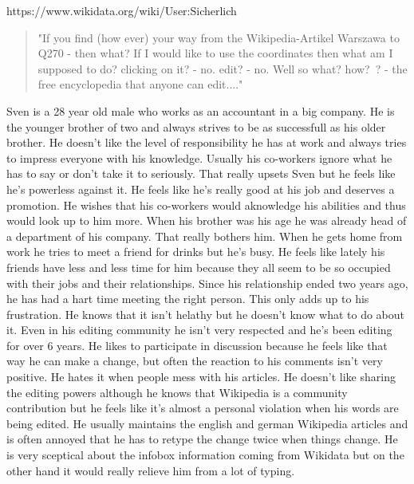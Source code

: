\documentclass{article}
\begin{document}
\pagebreak

https://www.wikidata.org/wiki/User:Sicherlich
\begin{quote}
"If you find (how ever) your way from the Wikipedia-Artikel Warszawa to Q270 - then what? If I would like to use the coordinates then what am I supposed to do? clicking on it? - no. edit? - no. Well so what? how? ? - the free encyclopedia that anyone can edit...."
\end{quote}

Sven is a 28 year old male who works as an accountant in a big company. He is the younger brother of two and always strives to be as successfull as his older brother. He doesn't like the level of responsibility he has at work and always tries to impress everyone with his knowledge. Usually his co-workers ignore what he has to say or don't take it to seriously. That really upsets Sven but he feels like he's powerless against it. He feels like he's really good at his job and deserves a promotion. He wishes that his co-workers would aknowledge his abilities and thus would look up to him more. When his brother was his age he was already head of a department of his company. That really bothers him. 
When he gets home from work he tries to meet a friend for drinks but he's busy. He feels like lately his friends have less and less time for him because they all seem to be so occupied with their jobs and their relationships. Since his relationship ended two years ago, he has had a hart time meeting the right person. This only adds up to his frustration. He knows that it isn't helathy but he doesn't know what to do about it. Even in his editing community he isn't very respected and he's been editing for over 6 years. He likes to participate in discussion because he feels like that way he can make a change, but often the reaction to his comments isn't very positive. 
He hates it when people mess with his articles. He doesn't like sharing the editing powers although he knows that Wikipedia is a community contribution but he feels like it's almost a personal violation when his words are being edited. He usually maintains the english and german Wikipedia articles and is often annoyed that he has to retype the change twice when things change. He is very sceptical about the infobox information coming from Wikidata but on the other hand it would really relieve him from a lot of typing. 
\end{document}
